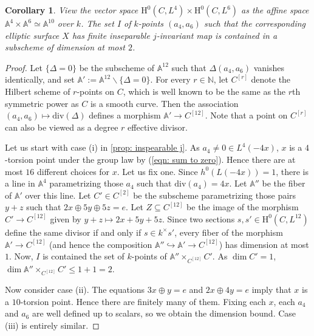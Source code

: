 \documentclass[11pt, letterpaper]{amsart}
\theoremstyle{plain}
\newtheorem{corollary}[theorem]{Corollary}
\theoremstyle{definition}
\newcommand{\IA}{\mathbb{A}}
\newcommand{\IN}{\mathbb{N}}
\newcommand{\<}{\langle}
\renewcommand{\>}{\rangle}
\newcommand{\into}{\hookrightarrow}
\renewcommand{\H}{\mathrm{H}}
\begin{document}
\begin{corollary}
\label{cor: bound inseparable}
    View the vector space $\H^0(C, L^4) \times \H^0(C, L^6)$ as the affine space $\IA^4 \times \IA^6 \simeq \IA^{10}$ over $k$. The set $I$ of $k$-points $(a_4, a_6)$ such that the corresponding elliptic surface $X$ has finite inseparable $j$-invariant map is contained in a subscheme of dimension at most $2$. 
\end{corollary}
\begin{proof}
     
    Let $\{ \Delta = 0 \}$ be the subscheme of $\IA^{12}$ such that $\Delta(a_4, a_6)$ vanishes identically, and set $\IA' := \IA^{12} \smallsetminus \{ \Delta = 0 \}$. 
    For every $r \in \IN$, let $C^{[r]}$ denote the Hilbert scheme of $r$-points on $C$, which is well known to be the same as the $r$th symmetric power as $C$ is a smooth curve. 
    Then the association $(a_4, a_6) \mapsto \mathrm{div}(\Delta)$ defines a morphism $\IA' \to C^{[12]}$. 
    Note that a point on $C^{[r]}$ can also be viewed as a degree $r$ effective divisor. 

    Let us start with case (i) in \cref{prop: inspearable j}. As $a_4 \neq 0 \in L^4(-4 x)$, $x$ is a $4$-torsion point under the group law by (\ref{eqn: sum to zero}). Hence there are at most $16$ different choices for $x$. Let us fix one. Since $h^0(L(-4x)) = 1$, there is a line in $\IA^4$ parametrizing those $a_4$ such that $\mathrm{div}(a_4) = 4x$. 
    Let $\IA''$ be the fiber of $\IA'$ over this line.  
    Let $C' \in C^{[2]}$ be the subscheme parametrizing those pairs $y + z$ such that $2x \oplus 5y \oplus 5z = e$.
    Let $Z \subseteq C^{[12]}$ be the image of the morphism $C' \to C^{[12]}$ given by $y + z \mapsto 2 x + 5y + 5z$. 
    Since two sections $s, s' \in \H^0(C, L^{12})$ define the same divisor if and only if $s \in k^\times s'$, every fiber of the morphism $\IA' \to C^{[12]}$ (and hence the composition $\IA'' \into \IA' \to C^{[12]}$) has dimension at most $1$.
    Now, $I$ is contained the set of $k$-points of $\IA'' \times_{C^{[12]}} C'$. 
    As $\dim C' = 1$, $\dim \IA'' \times_{C^{[12]}} C' \le 1 + 1 = 2$. 

    Now consider case (ii). The equations $3 x \oplus y = e$ and $2x \oplus 4y = e$ imply that $x$ is a $10$-torsion point. Hence there are finitely many of them. Fixing each $x$, each $a_4$ and $a_6$ are well defined up to scalars, so we obtain the dimension bound. Case (iii) is entirely similar. 
\end{proof}
\end{document}

